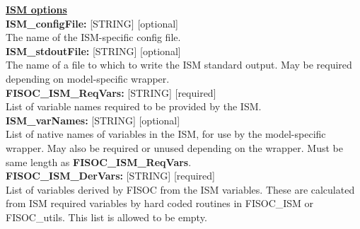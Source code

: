 \documentclass[12pt]{article}
\begin{document}
\begin{flushleft}
\textbf{\underline{ISM options}} \\
\vspace{6pt}
\textbf{ISM\_configFile:}     [STRING] [optional]                          \\
The name of the ISM-specific config file.                                  \\
\vspace{6pt}
\textbf{ISM\_stdoutFile:}     [STRING] [optional]                          \\
The name of a file to which to write the ISM standard output.  May be 
required depending on model-specific wrapper.                              \\
\vspace{6pt}
\textbf{FISOC\_ISM\_ReqVars:} [STRING] [required]                          \\
List of variable names required to be provided by the ISM.                 \\
\vspace{6pt}
\textbf{ISM\_varNames:} [STRING] [optional]                                \\
List of native names of variables in the ISM, for use by the model-specific 
wrapper.  May also be required or unused depending on the wrapper. Must be 
same length as \textbf{FISOC\_ISM\_ReqVars}.                               \\
\vspace{6pt}
\textbf{FISOC\_ISM\_DerVars:} [STRING] [required]                          \\
List of variables derived by FISOC from the ISM variables. These are 
calculated from ISM required variables by hard coded routines in 
FISOC\_ISM or FISOC\_utils. This list is allowed to be empty.              \\
\vspace{6pt}

\end{flushleft}
\end{document}
